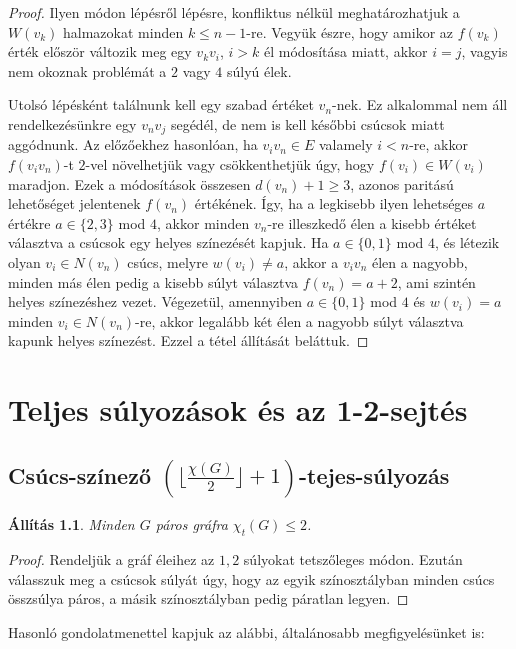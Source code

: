 \documentclass[12pt, a4paper]{report}
\newtheorem{áll}[tét]{Állítás}
\theoremstyle{remark}
\theoremstyle{definition}
\begin{document}
\begin{proof}
Ilyen módon lépésről lépésre, konfliktus nélkül meghatározhatjuk a $W(v_k)$ halmazokat minden $k \leq n - 1$-re. Vegyük észre, hogy amikor az $f(v_k)$ érték először változik meg egy $v_k v_i$, $i > k$ él módosítása miatt, akkor $i = j$, vagyis nem okoznak problémát a $2$ vagy $4$ súlyú élek.

Utolsó lépésként találnunk kell egy szabad értéket $v_n$-nek. Ez alkalommal nem áll rendelkezésünkre egy $v_n v_j$ segédél, de nem is kell későbbi csúcsok miatt aggódnunk. Az előzőekhez hasonlóan, ha $v_i v_n \in E$ valamely $i < n$-re, akkor $f(v_i v_n)$-t $2$-vel növelhetjük vagy csökkenthetjük úgy, hogy $f(v_i) \in W(v_i)$ maradjon. Ezek a módosítások összesen $d(v_n) +1 \geq 3$, azonos paritású lehetőséget jelentenek $f(v_n)$ értékének. Így, ha a legkisebb ilyen lehetséges $a$ értékre $a \in \lbrace 2, 3 \rbrace$ mod $4$, akkor minden $v_n$-re illeszkedő élen a kisebb értéket választva a csúcsok egy helyes színezését kapjuk. Ha $a \in \lbrace 0, 1 \rbrace$ mod $4$, és létezik olyan $v_i \in N(v_n)$ csúcs, melyre $w(v_i) \neq a$, akkor a $v_i v_n$ élen a nagyobb, minden más élen pedig a kisebb súlyt választva $f(v_n) = a + 2$, ami szintén helyes színezéshez vezet. Végezetül, amennyiben $a \in \lbrace 0, 1 \rbrace$ mod $4$ és $w(v_i) = a$ minden $v_i \in N(v_n)$-re, akkor legalább két élen a nagyobb súlyt választva kapunk helyes színezést. Ezzel a tétel állítását beláttuk.
\end{proof}

\chapter{Teljes súlyozások és az 1-2-sejtés}

\section{Csúcs-színező $(\lfloor \frac{χ(G)}{2} \rfloor + 1)$-tejes-súlyozás}

\begin{áll}
Minden $G$ páros gráfra $\chi_t(G) \leq 2$.
\end{áll}

\begin{proof}
Rendeljük a gráf éleihez az $1, 2$ súlyokat tetszőleges módon. Ezután válasszuk meg a csúcsok súlyát úgy, hogy az egyik színosztályban minden csúcs összsúlya páros, a másik színosztályban pedig páratlan legyen.
\end{proof}

Hasonló gondolatmenettel kapjuk az alábbi, általánosabb megfigyelésünket is:
\end{document}

